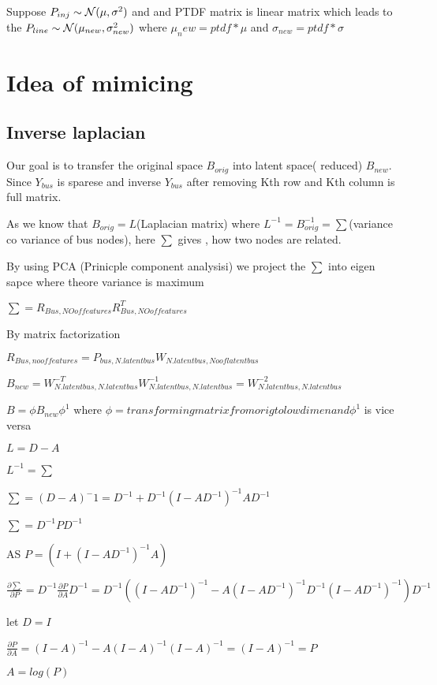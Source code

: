 \documentclass[12pt]{article}
\begin{document}
Suppose $P_{inj} \sim {\cal N}(\mu,\sigma^2)$ and and PTDF matrix is linear matrix which leads to the $P_{line} \sim{\cal N}(\mu_{new},\sigma_{new}^2)$  where $ \mu_new=ptdf*\mu$ and $\sigma_{new}=ptdf*\sigma$

\section{Idea of mimicing}
\subsection{Inverse laplacian}

Our goal is to transfer the original space $B_{orig}$  into latent space( reduced) $B_{new}$. Since $Y_{bus}$ is sparese and inverse $Y_{bus}$ after removing Kth row  and Kth column is full matrix. 

As we know that $ B_{orig}=L$(Laplacian matrix)
where $ L^{-1}=B_{orig}^{-1}=\sum$(variance co variance of bus nodes), here $\sum$ gives , how two nodes are related.

By using PCA (Prinicple component analysisi) we project the $\sum$ into eigen sapce where theore variance is maximum

$\sum=R_{Bus,NO of features} R_{Bus,NO of features}^T$

By matrix factorization

$R_{Bus, no of features}=P_{bus,N.latent bus}W_{N.latent bus, No of latent bus}$

$B_{new}=W_{N. latent bus, N.latent bus}^{-T} W_{N.latent bus, N.latent bus}^{-1}=W_{N.latent bus, N.latent bus}^{-2}$

$B=\phi B_{new} \phi^1$ where $\phi=transforming matrix from orig to lowdimen and  \phi^1$ is vice versa

$L=D-A$

$L^{-1}=\sum$

$\sum=(D-A)^-1 = D^{-1}+D^{-1}(I-AD^{-1})^{-1}AD^{-1}$ 

$\sum=D^{-1}PD^{-1}$

AS $P=(I+(I-AD^{-1})^{-1}A)$

$\frac{\partial \sum}{\partial P}=D^{-1}\frac{\partial P}{\partial A}D^{-1}=D^{-1}((I-AD^{-1})^{-1}-A(I-AD^{-1})^{-1}D^{-1}(I-AD^{-1})^{-1})D^{-1}$

let $D=I$

$\frac{\partial P}{\partial A}=(I-A)^{-1}-A(I-A)^{-1}(I-A)^{-1}=(I-A)^{-1}=P$

$A=log(P)$
\end{document}
